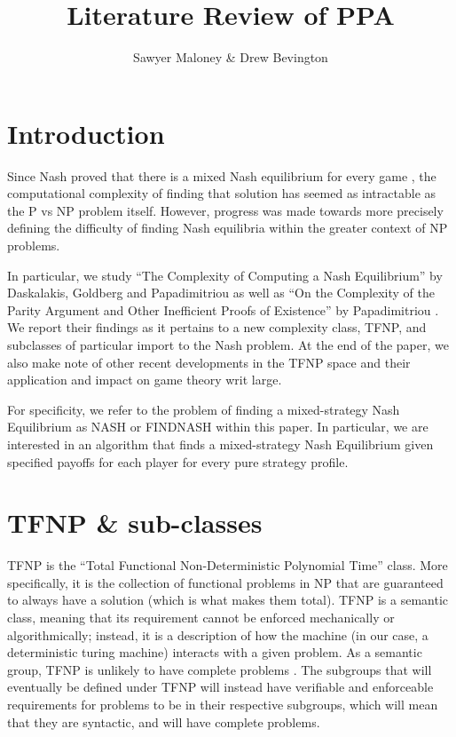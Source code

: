 \documentclass[10pt]{article}
\theoremstyle{definition}
\theoremstyle{remark}
\theoremstyle{definition}
\begin{document}
  

\author{Sawyer Maloney \& Drew Bevington}
\title{Literature Review of PPA}
\date{}

\maketitle

\pagestyle{plain}   

\section{Introduction}
Since Nash proved that there is a mixed Nash equilibrium for every game \cite{nash1951noncooperative}, the computational complexity of finding that solution has seemed as intractable as the P vs NP problem itself. However, progress was made towards more precisely defining the difficulty of finding Nash equilibria within the greater context of NP problems. 

In particular, we study “The Complexity of Computing a Nash Equilibrium” by Daskalakis, Goldberg and Papadimitriou \cite{daskalakis2006complexity} as well as “On the Complexity of the Parity Argument and Other Inefficient Proofs of Existence” by Papadimitriou \cite{papadimitriou1994complexity}. We report their findings as it pertains to a new complexity class, TFNP, and subclasses of particular import to the Nash problem. At the end of the paper, we also make note of other recent developments in the TFNP space and their application and impact on game theory writ large.

For specificity, we refer to the problem of finding a mixed-strategy Nash Equilibrium as NASH or FINDNASH within this paper. In particular, we are interested in an algorithm that finds a mixed-strategy Nash Equilibrium given specified payoffs for each player for every pure strategy profile. 

\section{TFNP \& sub-classes}
TFNP is the “Total Functional Non-Deterministic Polynomial Time” class. More specifically, it is the collection of functional problems in NP that are guaranteed to always have a solution (which is what makes them total). TFNP is a semantic class, meaning that its requirement cannot be enforced mechanically or algorithmically; instead, it is a description of how the machine (in our case, a deterministic turing machine) interacts with a given problem. As a semantic group, TFNP is unlikely to have complete problems \cite{papadimitriou1994complexity}. The subgroups that will eventually be defined under TFNP will instead have verifiable and enforceable requirements for problems to be in their respective subgroups, which will mean that they are syntactic, and will have complete problems. 
\end{document}
